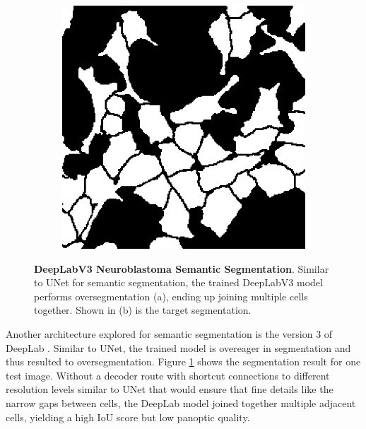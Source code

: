 \documentclass[journal]{IEEEtran}
\begin{document}
\begin{figure}
\begin{subfigure}[b]{0.45\linewidth}
\includegraphics[width=\linewidth]{unet/110115.jpg}
\caption{}
\end{subfigure}
\caption{\textbf{DeepLabV3 Neuroblastoma Semantic Segmentation}. Similar to UNet for semantic segmentation, the trained DeepLabV3 model performs oversegmentation (a), ending up joining multiple cells together. Shown in (b) is the target segmentation.}
\label{fig:deeplab_results}
\end{figure}
Another architecture explored for semantic segmentation is the version 3 of DeepLab \cite{DBLP:journals/corr/ChenPSA17}. Similar to UNet, the trained model is overeager in segmentation and thus resulted to oversegmentation. Figure \ref{fig:deeplab_results} shows the segmentation result for one test image. Without a decoder route with shortcut connections to different resolution levels similar to UNet that would ensure that fine details like the narrow gaps between cells, the DeepLab model joined together multiple adjacent cells, yielding a high IoU score but low panoptic quality.
\end{document}
